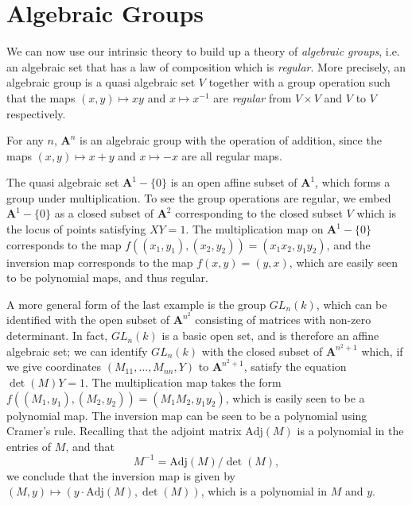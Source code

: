 \section{Algebraic Groups}

We can now use our intrinsic theory to build up a theory of \emph{algebraic groups}, i.e. an algebraic set that has a law of composition which is \emph{regular}. More precisely, an algebraic group is a quasi algebraic set $V$ together with a group operation such that the maps $(x,y) \mapsto xy$ and $x \mapsto x^{-1}$ are \emph{regular} from $V \times V$ and $V$ to $V$ respectively.

\begin{example}
    For any $n$, $\mathbf{A}^n$ is an algebraic group with the operation of addition, since the maps $(x,y) \mapsto x + y$ and $x \mapsto -x$ are all regular maps.
\end{example}

\begin{example}
    The quasi algebraic set $\mathbf{A}^1 - \{ 0 \}$ is an open affine subset of $\mathbf{A}^1$, which forms a group under multiplication. To see the group operations are regular, we embed $\mathbf{A}^1 - \{ 0 \}$ as a closed subset of $\mathbf{A}^2$ corresponding to the closed subset $V$ which is the locus of points satisfying $XY = 1$. The multiplication map on $\mathbf{A}^1 - \{ 0 \}$ corresponds to the map $f((x_1,y_1),(x_2,y_2)) = (x_1x_2,y_1y_2)$, and the inversion map corresponds to the map $f(x,y) = (y,x)$, which are easily seen to be polynomial maps, and thus regular.
\end{example}

\begin{example}
    A more general form of the last example is the group $GL_n(k)$, which can be identified with the open subset of $\mathbf{A}^{n^2}$ consisting of matrices with non-zero determinant. In fact, $GL_n(k)$ is a basic open set, and is therefore an affine algebraic set; we can identify $GL_n(k)$ with the closed subset of $\mathbf{A}^{n^2+1}$ which, if we give coordinates $(M_{11},\dots,M_{nn},Y)$ to $\mathbf{A}^{n^2+1}$, satisfy the equation $\det(M) Y = 1$. The multiplication map takes the form $f((M_1,y_1),(M_2,y_2)) = (M_1M_2,y_1y_2)$, which is easily seen to be a polynomial map. The inversion map can be seen to be a polynomial using Cramer's rule. Recalling that the adjoint matrix $\text{Adj}(M)$ is a polynomial in the entries of $M$, and that
    \[ M^{-1} = \text{Adj}(M) / \det(M), \]
    we conclude that the inversion map is given by $(M,y) \mapsto (y \cdot \text{Adj}(M), \det(M))$, which is a polynomial in $M$ and $y$.
\end{example}

